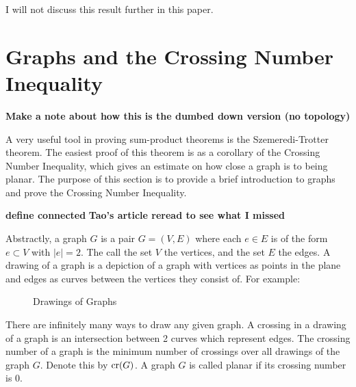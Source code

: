 \documentclass[12pt]{amsart}
\begin{document}
I will not discuss this result further in this paper.

\section{Graphs and the Crossing Number Inequality}

\textbf{Make a note about how this is the dumbed down version (no topology)}

A very useful tool in proving sum-product theorems is the Szemeredi-Trotter theorem. The
easiest proof of this theorem is as a corollary of the Crossing Number Inequality, which gives
an estimate on how close a graph is to being planar. The purpose of this section
is to provide a brief introduction to graphs and prove the Crossing Number Inequality.

\textbf{define connected}
\textbf{Tao's article reread to see what I missed}

Abstractly, a graph \(G\) is a pair \(G = (V,E)\) where each \(e \in E\) is of the form \(e \subset V\) with \(\left\lvert e \right\rvert = 2\).
The call the set \(V\) the vertices, and the set \(E\) the edges. A drawing of a graph
is a depiction of a graph with vertices as points in the plane and edges as curves between the
vertices they consist of. For example:

\begin{figure}[h]
    \centering
    \qquad
    \caption{Drawings of Graphs}
\end{figure}

There are infinitely many ways to draw any given graph. A crossing in a drawing
of a graph is an intersection between 2 curves which represent edges. The 
crossing number of a graph is the minimum number of crossings
over all drawings of the graph \(G\). Denote this by
\(\operatorname{cr}(G)\). A graph \(G\) is called planar if its crossing number is 0.
\end{document}
